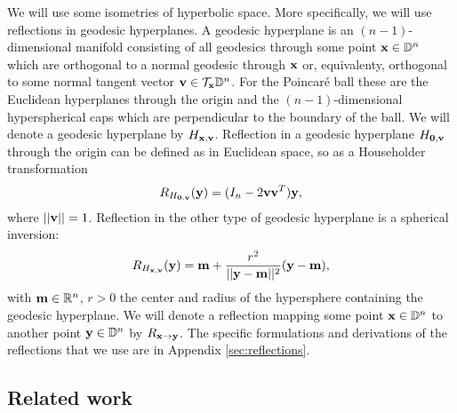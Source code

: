 We will use some isometries of hyperbolic space. More specifically, we will use reflections in geodesic hyperplanes. A geodesic hyperplane is an $(n-1)$-dimensional manifold consisting of all geodesics through some point $\mathbf{x} \in \mathbb{D}^n$ which are orthogonal to a normal geodesic through $\mathbf{x}$ or, equivalenty, orthogonal to some normal tangent vector $\mathbf{v} \in \mathcal{T}_{\mathbf{x}} \mathbb{D}^n$. For the Poincaré ball these are the Euclidean hyperplanes through the origin and the $(n-1)$-dimensional hyperspherical caps which are perpendicular to the boundary of the ball. We will denote a geodesic hyperplane by $H_{\mathbf{x}, \mathbf{v}}$. Reflection in a geodesic hyperplane $H_{\mathbf{0}, \mathbf{v}}$ through the origin can be defined as in Euclidean space, so as a Householder transformation
\begin{equation}
    R_{H_{\mathbf{0}, \mathbf{v}}}(\mathbf{y}) = (I_n - 2 \mathbf{v} \mathbf{v}^T) \mathbf{y},
\end{equation}
where $||\mathbf{v}|| = 1$. Reflection in the other type of geodesic hyperplane is a spherical inversion:
\begin{equation}
    R_{H_{\mathbf{x}, \mathbf{v}}}(\mathbf{y}) = \mathbf{m} + \frac{r^2}{||\mathbf{y} - \mathbf{m}||^2} (\mathbf{y} - \mathbf{m}),
\end{equation}
with $\mathbf{m} \in \mathbb{R}^n$, $r > 0$ the center and radius of the hypersphere containing the geodesic hyperplane. We will denote a reflection mapping some point $\mathbf{x} \in \mathbb{D}^n$ to another point $\mathbf{y} \in \mathbb{D}^n$ by $R_{\mathbf{x} \rightarrow \mathbf{y}}$. The specific formulations and derivations of the reflections that we use are in Appendix \ref{sec:reflections}.

\vspace{-0.1cm}

\subsection{Related work}
\vspace{-0.15cm}
